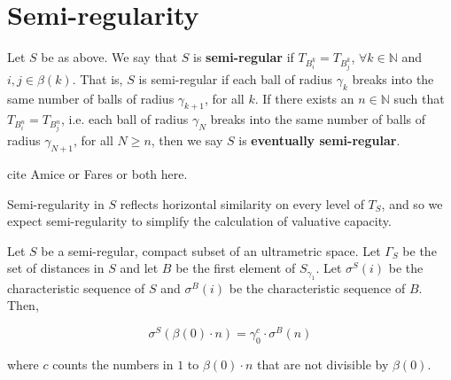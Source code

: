 \section*{Semi-regularity}

\begin{definition*}
Let $S$ be as above. We say that $S$ is \textbf{semi-regular} if $T_{B^k_i} = T_{B^k_j}$, $\forall k \in \mathbb{N}$ and  $i,j \in \beta(k)$. That is, $S$ is semi-regular if each ball of radius $\gamma_k$ breaks into the same number of balls of radius $\gamma_{k+1}$, for all $k$. If there exists an $n \in \mathbb{N}$ such that $T_{B^n_i} = T_{B^n_j}$, i.e.  each ball of radius $\gamma_N$ breaks into the same number of balls of radius $\gamma_{N+1}$, for all $N \geq n$, then we say $S$ is \textbf{eventually semi-regular}.
\end{definition*}
cite Amice or Fares or both here.


Semi-regularity in $S$ reflects horizontal similarity on every level of $T_S$, and so we expect semi-regularity to simplify the calculation of valuative capacity.

\begin{proposition*}
Let $S$ be a semi-regular, compact subset of an ultrametric space. Let $\Gamma_S$ be the set of distances in $S$ and let $B$ be the first element of $S_{\gamma_1}$. Let $\sigma^S(i)$  be the characteristic sequence of $S$ and $\sigma^B(i)$ be the characteristic sequence of $B$. Then,

\[\sigma^S(\beta(0) \cdot n)=\gamma_0^c \cdot \sigma^{B}(n)\]

where $c$ counts the numbers in $1$ to $\beta(0) \cdot n$ that are not divisible by $\beta(0)$.

\end{proposition*}

